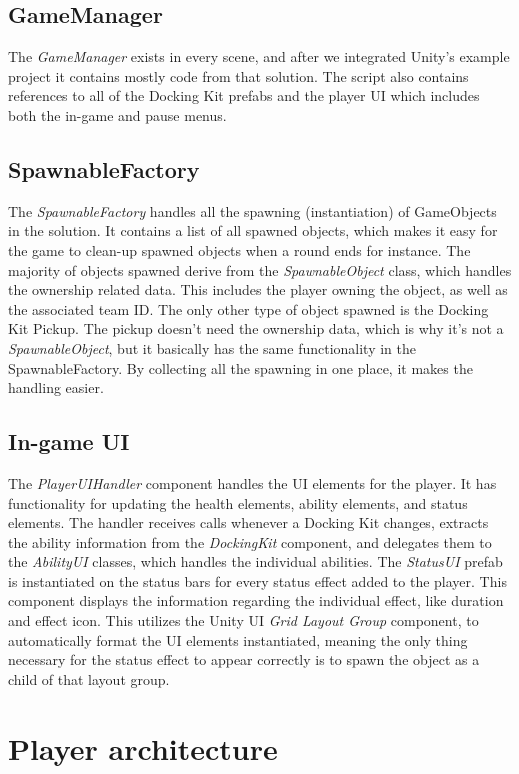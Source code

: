 \subsection{GameManager}
The \emph{GameManager} exists in every scene, and after we integrated Unity's example project it contains mostly code from that solution. The script also contains references to all of the Docking Kit prefabs and the player UI which includes both the in-game and pause menus. 

\subsection{SpawnableFactory}
The \emph{SpawnableFactory} handles all the spawning (instantiation) of GameObjects in the solution. It contains a list of all spawned objects, which makes it easy for the game to clean-up spawned objects when a round ends for instance. The majority of objects spawned derive from the \emph{SpawnableObject} class, which handles the ownership related data. This includes the player owning the object, as well as the associated team ID. The only other type of object spawned is the Docking Kit Pickup. The pickup doesn't need the ownership data, which is why it's not a \emph{SpawnableObject}, but it basically has the same functionality in the SpawnableFactory. By collecting all the spawning in one place, it makes the handling easier.

\subsection{In-game UI}
The \emph{PlayerUIHandler} component handles the UI elements for the player. It has functionality for updating the health elements, ability elements, and status elements. The handler receives calls whenever a Docking Kit changes, extracts the ability information from the \emph{DockingKit} component, and delegates them to the \emph{AbilityUI} classes, which handles the individual abilities. The \emph{StatusUI} prefab is instantiated on the status bars for every status effect added to the player. This component displays the information regarding the individual effect, like duration and effect icon. This utilizes the Unity UI \emph{Grid Layout Group} component, to automatically format the UI elements instantiated, meaning the only thing necessary for the status effect to appear correctly is to spawn the object as a child of that layout group.

\section{Player architecture}

